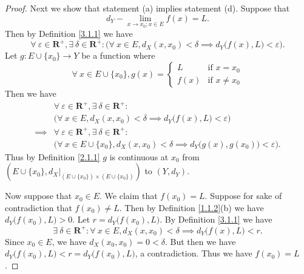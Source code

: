 \begin{proof}
    Next we show that statement (a) implies statement (d).
    Suppose that
    \[
        d_Y - \lim_{x \to x_0 ; x \in E} f(x) = L.
    \]
    Then by Definition \ref{3.1.1} we have
    \[
        \forall\ \varepsilon \in \mathbf{R}^+, \exists\ \delta \in \mathbf{R}^+ : \Big(\forall\ x \in E, d_X(x, x_0) < \delta \implies d_Y\big(f(x), L\big) < \varepsilon\Big).
    \]
    Let \(g : E \cup \{x_0\} \to Y\) be a function where
    \[
        \forall\ x \in E \cup \{x_0\}, g(x) = \begin{cases}
            L    & \text{if } x = x_0    \\
            f(x) & \text{if } x \neq x_0
        \end{cases}
    \]
    Then we have
    \begin{align*}
                 & \forall\ \varepsilon \in \mathbf{R}^+, \exists\ \delta \in \mathbf{R}^+ :                                       \\
                 & \Big(\forall\ x \in E, d_X(x, x_0) < \delta \implies d_Y\big(f(x), L\big) < \varepsilon\Big)                    \\
        \implies & \forall\ \varepsilon \in \mathbf{R}^+, \exists\ \delta \in \mathbf{R}^+ :                                       \\
                 & \Big(\forall\ x \in E \cup \{x_0\}, d_X(x, x_0) < \delta \implies d_Y\big(g(x), g(x_0)\big) < \varepsilon\Big).
    \end{align*}
    Thus by Definition \ref{2.1.1} \(g\) is continuous at \(x_0\) from \((E \cup \{x_0\}, d_X|_{(E \cup \{x_0\}) \times (E \cup \{x_0\})})\) to \((Y, d_Y)\).

    Now suppose that \(x_0 \in E\).
    We claim that \(f(x_0) = L\).
    Suppose for sake of contradiction that \(f(x_0) \neq L\).
    Then by Definition \ref{1.1.2}(b) we have \(d_Y\big(f(x_0), L\big) > 0\).
    Let \(r = d_Y\big(f(x_0), L\big)\).
    By Definition \ref{3.1.1} we have
    \[
        \exists\ \delta \in \mathbf{R}^+ : \forall\ x \in E, d_X(x, x_0) < \delta \implies d_Y\big(f(x), L\big) < r.
    \]
    Since \(x_0 \in E\), we have \(d_X(x_0, x_0) = 0 < \delta\).
    But then we have \(d_Y\big(f(x_0), L\big) < r = d_Y\big(f(x_0), L\big)\), a contradiction.
    Thus we have \(f(x_0) = L\).


\end{proof}
